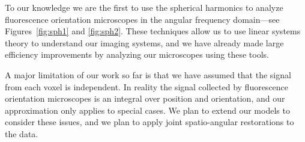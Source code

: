 \documentclass[11pt]{article}
\begin{document}
To our knowledge we are the first to use the spherical harmonics to analyze
fluorescence orientation microscopes in the angular frequency domain---see
Figures~\ref{fig:sph1} and \ref{fig:sph2}. These techniques allow us to use
linear systems theory to understand our imaging systems, and we have already
made large efficiency improvements by analyzing our microscopes using these
tools.

A major limitation of our work so far is that we have assumed that the signal
from each voxel is independent. In reality the signal collected by fluorescence
orientation microscopes is an integral over position and orientation, and our
approximation only applies to special cases. We plan to extend our models to
consider these issues, and we plan to apply joint spatio-angular restorations to
the data.
  
\end{document}
